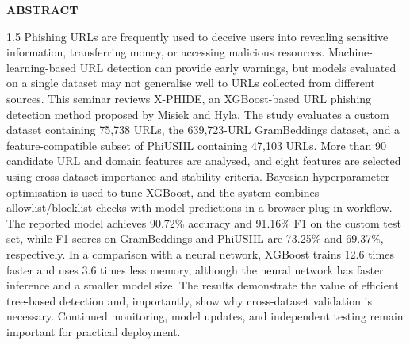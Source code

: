 \newpage
\renewcommand\contentsname{\MakeUppercase{\large contents}\bf\hspace{11cm}\large PAGE NO}
\thispagestyle{empty}
\tableofcontents
\thispagestyle{empty}
\newpage
{}
\fancyhf{}
\fancyfoot[R]{\hfill\thepage}
\renewcommand{\footrulewidth}{0pt}
\begin{center}
  \vspace*{1cm}
  \textbf{\large ABSTRACT}
\end{center}
{\normalsize
\begin{spacing}{1.5}
Phishing URLs are frequently used to deceive users into revealing sensitive information, transferring money, or accessing malicious resources. Machine-learning-based URL detection can provide early warnings, but models evaluated on a single dataset may not generalise well to URLs collected from different sources. This seminar reviews X-PHIDE, an XGBoost-based URL phishing detection method proposed by Misiek and Hyla. The study evaluates a custom dataset containing 75,738 URLs, the 639,723-URL GramBeddings dataset, and a feature-compatible subset of PhiUSIIL containing 47,103 URLs. More than 90 candidate URL and domain features are analysed, and eight features are selected using cross-dataset importance and stability criteria. Bayesian hyperparameter optimisation is used to tune XGBoost, and the system combines allowlist/blocklist checks with model predictions in a browser plug-in workflow. The reported model achieves 90.72\% accuracy and 91.16\% F1 on the custom test set, while F1 scores on GramBeddings and PhiUSIIL are 73.25\% and 69.37\%, respectively. In a comparison with a neural network, XGBoost trains 12.6 times faster and uses 3.6 times less memory, although the neural network has faster inference and a smaller model size. The results demonstrate the value of efficient tree-based detection and, importantly, show why cross-dataset validation is necessary. Continued monitoring, model updates, and independent testing remain important for practical deployment.\cite{bib1}

\end{spacing}
}

\listoffigures
\thispagestyle{fancy}
\fancyhf{}
\fancyfoot[R]{\hfill\thepage}
\renewcommand{\footrulewidth}{0pt}

